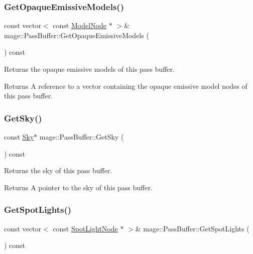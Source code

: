 \subsubsection{\texorpdfstring{Get\+Opaque\+Emissive\+Models()}{GetOpaqueEmissiveModels()}}
{\footnotesize\ttfamily const vector$<$ const \hyperlink{classmage_1_1_model_node}{Model\+Node} $\ast$ $>$\& mage\+::\+Pass\+Buffer\+::\+Get\+Opaque\+Emissive\+Models (\begin{DoxyParamCaption}{ }\end{DoxyParamCaption}) const\hspace{0.3cm}{\ttfamily [noexcept]}}

Returns the opaque emissive models of this pass buffer.

\begin{DoxyReturn}{Returns}
A reference to a vector containing the opaque emissive model nodes of this pass buffer. 
\end{DoxyReturn}
\hypertarget{structmage_1_1_pass_buffer_af6355cb9bd927f53bb93347348f21a11}{}\label{structmage_1_1_pass_buffer_af6355cb9bd927f53bb93347348f21a11} 
\subsubsection{\texorpdfstring{Get\+Sky()}{GetSky()}}
{\footnotesize\ttfamily const \hyperlink{structmage_1_1_sky}{Sky}$\ast$ mage\+::\+Pass\+Buffer\+::\+Get\+Sky (\begin{DoxyParamCaption}{ }\end{DoxyParamCaption}) const\hspace{0.3cm}{\ttfamily [noexcept]}}

Returns the sky of this pass buffer.

\begin{DoxyReturn}{Returns}
A pointer to the sky of this pass buffer. 
\end{DoxyReturn}
\hypertarget{structmage_1_1_pass_buffer_a73b50abb85924fcd1f52239ab7e3ecda}{}\label{structmage_1_1_pass_buffer_a73b50abb85924fcd1f52239ab7e3ecda} 
\subsubsection{\texorpdfstring{Get\+Spot\+Lights()}{GetSpotLights()}}
{\footnotesize\ttfamily const vector$<$ const \hyperlink{namespacemage_aeed5dee4ff6c591eabb0e9114256df4a}{Spot\+Light\+Node} $\ast$ $>$\& mage\+::\+Pass\+Buffer\+::\+Get\+Spot\+Lights (\begin{DoxyParamCaption}{ }\end{DoxyParamCaption}) const\hspace{0.3cm}{\ttfamily [noexcept]}}

